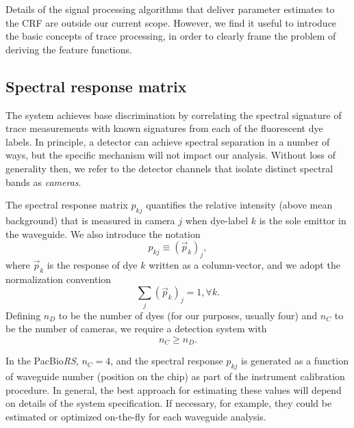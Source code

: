 \documentclass[10pt]{article}
\newcommand{\crf}{{\small CRF}}
\newcommand{\theRS}{the PacBio\hspace{2 pt}\textit{RS}}
\begin{document}
Details of the signal processing algorithms that deliver parameter estimates to the \crf{} are outside our current scope.
However, we find it useful to introduce the basic concepts of trace processing, in order to clearly frame the problem of deriving the feature functions. 

\subsection{Spectral response matrix}
\label{sec:spectral_response}

The system achieves base discrimination by correlating the spectral signature of trace measurements with known signatures from each of the fluorescent dye labels.  In principle, a detector can achieve spectral separation in a number of ways, but the specific mechanism will not impact our analysis.  Without loss of generality then, we refer to the detector channels that isolate distinct spectral bands as \emph{cameras}.

The spectral response matrix $p_{kj}$ quantifies the relative intensity (above mean background) that is measured in camera $j$ when dye-label $k$ is the sole emittor in the waveguide.  We also introduce the notation
\begin{equation}
p_{kj} \equiv (\vec{p}_k)_j, 
\end{equation}
where $\vec{p}_k$ is the response of dye $k$ written as a column-vector, and we adopt the normalization convention
\begin{equation}
\label{eq:spectra_norm}
\sum_j (\vec{p}_k)_j = 1, \forall k.
\end{equation}
Defining $n_D$ to be the number of dyes (for our purposes, usually four) and $n_C$ to be the number of cameras, we require a detection system with
\begin{equation}
n_C \geq n_D.
\end{equation} 

In \theRS, $n_C = 4$, and the spectral response $p_{kj}$ is generated as a function of waveguide number (position on the chip) as part of the instrument calibration procedure.  In general, the best approach for estimating these values will depend on details of the system specification.  If necessary, for example, they could be estimated or optimized on-the-fly for each waveguide analysis.

\end{document}

